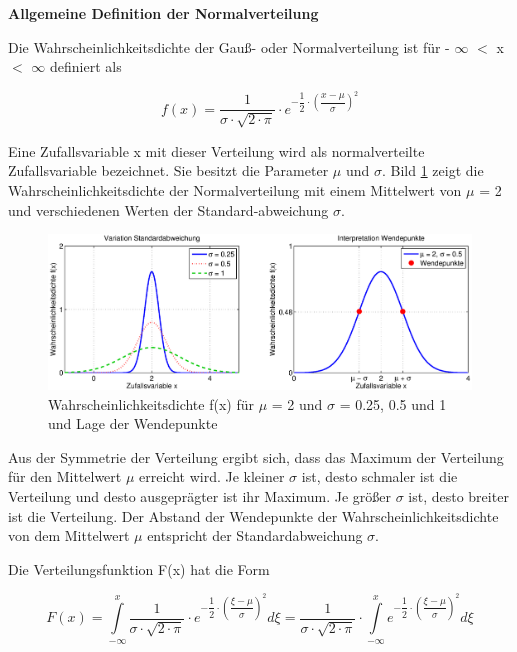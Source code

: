 {\selectfont
\noindent\textbf{Allgemeine Definition der Normalverteilung}}

\noindent Die Wahrscheinlichkeitsdichte der Gau{\ss}- oder Normalverteilung ist f\"{u}r - $\infty$ $\mathrm{<}$ x  $\mathrm{<}$ $\infty$ definiert als

\begin{equation}\label{eq:fourtwohundredseven}
f(x)=\dfrac{1}{\sigma \cdot \sqrt{2\cdot \pi } } \cdot e^{-\dfrac{1}{2} \cdot \left(\dfrac{x-\mu }{\sigma } \right)^{2} }
\end{equation}

\noindent Eine Zufallsvariable x mit dieser Verteilung wird als normalverteilte Zufallsvariable bezeichnet. Sie besitzt die Parameter $\mu$ und $\sigma$. Bild \ref{fig:Stetig_Normalverteilung1} zeigt die Wahrscheinlichkeitsdichte der Normalverteilung mit einem Mittelwert von $\mu$ = 2 und verschiedenen Werten der Standard-abweichung $\sigma$.

\begin{figure}[H]
  \centerline{\includegraphics[width=1\textwidth]{Kapitel4/Bilder/image34}}
  \caption{Wahrscheinlichkeitsdichte f(x) f\"{u}r $\mu$ = 2 und $\sigma$ = 0.25, 0.5 und 1 und Lage der Wendepunkte}
  \label{fig:Stetig_Normalverteilung1}
\end{figure}

\noindent Aus der Symmetrie der Verteilung ergibt sich, dass das Maximum der Verteilung f\"{u}r den Mittelwert $\mu$ erreicht wird. Je kleiner $\sigma$ ist, desto schmaler ist die Verteilung und desto ausgepr\"{a}gter ist ihr Maximum. Je gr\"{o}{\ss}er $\sigma$ ist, desto breiter ist die Verteilung. Der Abstand der Wendepunkte der Wahrscheinlichkeitsdichte von dem Mittelwert $\mu$ entspricht der Standardabweichung $\sigma$.

\noindent Die Verteilungsfunktion F(x) hat die Form 

\begin{equation}\label{eq:fourtwohundredeight}
F(x)=\int\limits  _{-\infty }^{x}\dfrac{1}{\sigma \cdot \sqrt{2\cdot \pi } } \cdot e^{-\dfrac{1}{2} \cdot \left(\dfrac{\xi -\mu }{\sigma } \right)^{2} }  d\xi =\dfrac{1}{\sigma \cdot \sqrt{2\cdot \pi } } \cdot \int\limits  _{-\infty }^{x}e^{-\dfrac{1}{2} \cdot \left(\dfrac{\xi -\mu }{\sigma } \right)^{2} }  d\xi
\end{equation}

